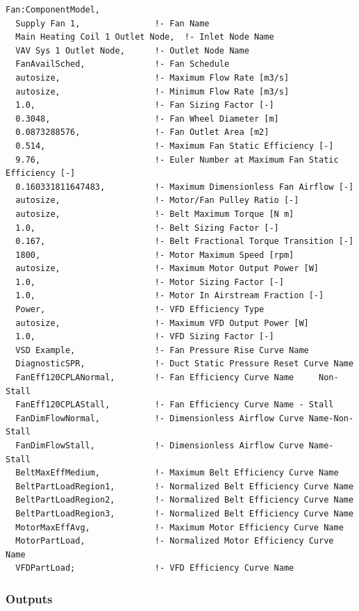 \begin{lstlisting}
Fan:ComponentModel,
  Supply Fan 1,               !- Fan Name
  Main Heating Coil 1 Outlet Node,  !- Inlet Node Name
  VAV Sys 1 Outlet Node,      !- Outlet Node Name
  FanAvailSched,              !- Fan Schedule
  autosize,                   !- Maximum Flow Rate [m3/s]
  autosize,                   !- Minimum Flow Rate [m3/s]
  1.0,                        !- Fan Sizing Factor [-]
  0.3048,                     !- Fan Wheel Diameter [m]
  0.0873288576,               !- Fan Outlet Area [m2]
  0.514,                      !- Maximum Fan Static Efficiency [-]
  9.76,                       !- Euler Number at Maximum Fan Static Efficiency [-]
  0.160331811647483,          !- Maximum Dimensionless Fan Airflow [-]
  autosize,                   !- Motor/Fan Pulley Ratio [-]
  autosize,                   !- Belt Maximum Torque [N m]
  1.0,                        !- Belt Sizing Factor [-]
  0.167,                      !- Belt Fractional Torque Transition [-]
  1800,                       !- Motor Maximum Speed [rpm]
  autosize,                   !- Maximum Motor Output Power [W]
  1.0,                        !- Motor Sizing Factor [-]
  1.0,                        !- Motor In Airstream Fraction [-]
  Power,                      !- VFD Efficiency Type
  autosize,                   !- Maximum VFD Output Power [W]
  1.0,                        !- VFD Sizing Factor [-]
  VSD Example,                !- Fan Pressure Rise Curve Name
  DiagnosticSPR,              !- Duct Static Pressure Reset Curve Name
  FanEff120CPLANormal,        !- Fan Efficiency Curve Name     Non-Stall
  FanEff120CPLAStall,         !- Fan Efficiency Curve Name - Stall
  FanDimFlowNormal,           !- Dimensionless Airflow Curve Name-Non-Stall
  FanDimFlowStall,            !- Dimensionless Airflow Curve Name-Stall
  BeltMaxEffMedium,           !- Maximum Belt Efficiency Curve Name
  BeltPartLoadRegion1,        !- Normalized Belt Efficiency Curve Name
  BeltPartLoadRegion2,        !- Normalized Belt Efficiency Curve Name
  BeltPartLoadRegion3,        !- Normalized Belt Efficiency Curve Name
  MotorMaxEffAvg,             !- Maximum Motor Efficiency Curve Name
  MotorPartLoad,              !- Normalized Motor Efficiency Curve Name
  VFDPartLoad;                !- VFD Efficiency Curve Name
\end{lstlisting}

\subsubsection{Outputs}\label{outputs-4-005}

